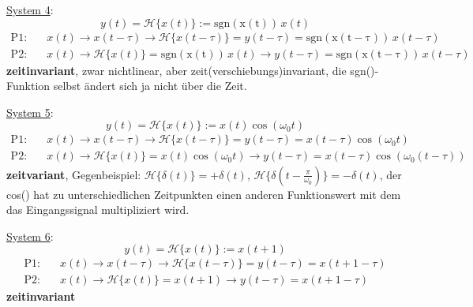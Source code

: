 \documentclass[11pt,a4paper,DIV=12]{scrartcl}
\numberwithin{equation}{section}
\numberwithin{figure}{section}
\newcommand{\sysH}[1]{\mathcal{H}{\{#1\}}}
\begin{document}
\begin{Loesung}
\item  \underline{System 4}:
\begin{equation}
y(t) = \sysH{x(t)}:= \mathrm{sgn(x(t))} \, x(t)
\end{equation}
\begin{align}
\text{P1:}& \quad x(t)\rightarrow x(t-\tau)\rightarrow \mathcal{H}\{x(t-\tau)\}=y(t-\tau)=\mathrm{sgn(x(t-\tau))} \, x(t-\tau)\\
\text{P2:}& \quad x(t)\rightarrow \mathcal{H}\{x(t)\}=\mathrm{sgn(x(t))} \, x(t)\rightarrow y(t-\tau)=\mathrm{sgn(x(t-\tau))} \, x(t-\tau)
\end{align}
\textbf{zeitinvariant}, zwar nichtlinear, aber zeit(verschiebungs)invariant, die
sgn()-Funktion selbst ändert sich ja nicht über die Zeit.

\item  \underline{System 5}:
\begin{equation}
y(t) = \sysH{x(t)}:= x(t) \cos(\omega_0 t)
\end{equation}
\begin{align}
\text{P1:}& \quad x(t)\rightarrow x(t-\tau)\rightarrow \mathcal{H}\{x(t-\tau)\}=y(t-\tau)=x(t-\tau) \cos(\omega_0 t)\\
\text{P2:}& \quad x(t)\rightarrow \mathcal{H}\{x(t)\}=x(t) \cos(\omega_0 t)\rightarrow y(t-\tau)=x(t-\tau) \cos(\omega_0 (t-\tau))
\end{align}
\textbf{zeitvariant}, Gegenbeispiel: $\sysH{\delta(t)}=+\delta(t)$,
$\sysH{\delta(t-\frac{\pi}{\omega_0})}=-\delta(t)$, der cos() hat zu unterschiedlichen
Zeitpunkten einen anderen Funktionswert mit dem das Eingangssignal
multipliziert wird.

\item  \underline{System 6}:
\begin{equation}
y(t) = \sysH{x(t)}:= x(t+1)
\end{equation}
\begin{align}
\text{P1:}& \quad x(t)\rightarrow x(t-\tau)\rightarrow \mathcal{H}\{x(t-\tau)\}=y(t-\tau)=x(t+1-\tau)\\
\text{P2:}& \quad x(t)\rightarrow \mathcal{H}\{x(t)\}=x(t+1)\rightarrow y(t-\tau)=x(t+1-\tau)
\end{align}
\textbf{zeitinvariant}


\end{Loesung}
\end{document}
